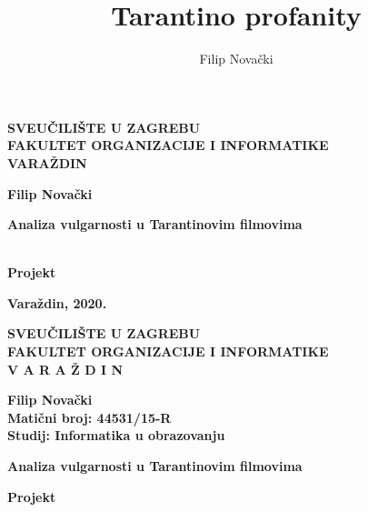 \documentclass[11pt]{foi}
\title{Tarantino profanity}
\author{Filip Novački}
\newcommand{\vrstaRada}{Projekt} %
\newcommand{\godina}{2020}
\newcommand{\indeks}{44531/15-R}
\newcommand{\smjer}{Informatika u obrazovanju} %
\begin{document}
\thispagestyle{empty}
\begin{center}
  {\large \fontsize{14}{17}\selectfont\bfseries{SVEU\v CILI\v STE U ZAGREBU}} \\[8pt]
  {\large \fontsize{14}{17}\selectfont\bfseries{FAKULTET ORGANIZACIJE I INFORMATIKE}} \\[8pt]
  {\large \fontsize{14}{17}\selectfont\bfseries{VARA\v ZDIN}}
\end{center}

\vskip 20mm
\begin{flushleft}
\Large \bfseries{Filip Novački}
\end{flushleft}

\vskip 60mm
\begin{center}
	{ \linespread{2.5}\sffamily\bfseries{\fontsize{22}{27}\selectfont\MakeUppercase Analiza vulgarnosti u Tarantinovim filmovima }\par}\ \\[10mm]
{\normalfont \large \bfseries{\fontsize{14}{17}\selectfont\MakeUppercase \vrstaRada }}
\end{center}

\vfill
\begin{center}
{\large \bfseries{Vara\v zdin}, \bfseries{\godina}.}
\end{center}

\newpage

\thispagestyle{empty}
\begin{center}
  {\bfseries{SVEU\v CILI\v STE U ZAGREBU}} \\[12pt]
  {\bfseries{FAKULTET ORGANIZACIJE I INFORMATIKE}} \\[12pt]
  {\bfseries{V A R A \v Z D I N}}
\end{center}

\vskip 15mm
\begin{flushleft}
{\bfseries{Filip Novački}}\\[8pt]
{\bfseries{Matični broj:} \bfseries{\indeks}}\\[8pt]
{\bfseries{Studij:} \bfseries{\smjer}}\\[8pt]
\end{flushleft}

\vskip 40mm
\begin{center}
{\sffamily \bfseries{\fontsize{14}{17}\selectfont\MakeUppercase Analiza vulgarnosti u Tarantinovim filmovima }\par} \vspace{10mm}
{\normalfont \bfseries{\MakeUppercase Projekt}}
\end{center}
\end{document}
